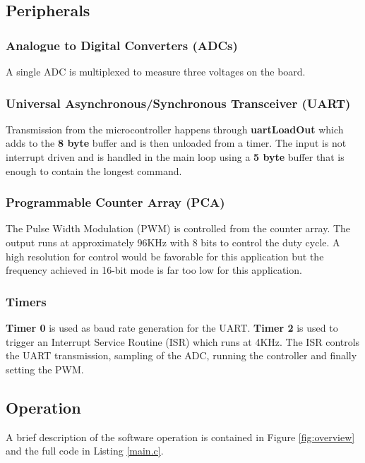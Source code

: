 \documentclass[12pt]{article}%
\begin{document}
\subsection{Peripherals}

\subsubsection{Analogue to Digital Converters (ADCs)}

A single ADC is multiplexed to measure three voltages on the board. 

\subsubsection{Universal Asynchronous/Synchronous Transceiver (UART)}

Transmission from the microcontroller happens through \textbf{uartLoadOut} which adds to the \textbf{8 byte} buffer and is then unloaded from a timer. The input is not interrupt driven and is handled in the main loop using a \textbf{5 byte} buffer that is enough to contain the longest command.

\subsubsection{Programmable Counter Array (PCA)}

The Pulse Width Modulation (PWM) is controlled from the counter array. The output runs at approximately 96KHz with 8 bits to control the duty cycle. A high resolution for control would be favorable for this application but the frequency achieved in 16-bit mode is far too low for this application.

\subsubsection{Timers}

\textbf{Timer 0} is used as baud rate generation for the UART. \textbf{Timer 2} is used to trigger an Interrupt Service Routine (ISR) which runs at 4KHz. The ISR controls the UART transmission, sampling of the ADC, running the controller and finally setting the PWM.

\subsection{Operation}

A brief description of the software operation is contained in Figure \ref{fig:overview} and the full code in Listing \ref{main.c}.
\end{document}
